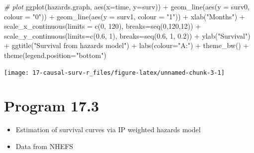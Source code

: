 \documentclass[
  10pt,
]{book}
\newenvironment{Shaded}{\begin{snugshade}}{\end{snugshade}}
\newcommand{\AttributeTok}[1]{\textcolor[rgb]{0.77,0.63,0.00}{#1}}
\newcommand{\CommentTok}[1]{\textcolor[rgb]{0.56,0.35,0.01}{\textit{#1}}}
\newcommand{\DecValTok}[1]{\textcolor[rgb]{0.00,0.00,0.81}{#1}}
\newcommand{\FloatTok}[1]{\textcolor[rgb]{0.00,0.00,0.81}{#1}}
\newcommand{\FunctionTok}[1]{\textcolor[rgb]{0.00,0.00,0.00}{#1}}
\newcommand{\NormalTok}[1]{#1}
\newcommand{\SpecialCharTok}[1]{\textcolor[rgb]{0.00,0.00,0.00}{#1}}
\newcommand{\StringTok}[1]{\textcolor[rgb]{0.31,0.60,0.02}{#1}}
\providecommand{\tightlist}{%
  \setlength{\itemsep}{0pt}\setlength{\parskip}{0pt}}
\begin{document}
\begin{Shaded}
\begin{Highlighting}[]
\CommentTok{\# plot}
\FunctionTok{ggplot}\NormalTok{(hazards.graph, }\FunctionTok{aes}\NormalTok{(}\AttributeTok{x=}\NormalTok{time, }\AttributeTok{y=}\NormalTok{surv)) }\SpecialCharTok{+} 
  \FunctionTok{geom\_line}\NormalTok{(}\FunctionTok{aes}\NormalTok{(}\AttributeTok{y =}\NormalTok{ surv0, }\AttributeTok{colour =} \StringTok{"0"}\NormalTok{)) }\SpecialCharTok{+} 
  \FunctionTok{geom\_line}\NormalTok{(}\FunctionTok{aes}\NormalTok{(}\AttributeTok{y =}\NormalTok{ surv1, }\AttributeTok{colour =} \StringTok{"1"}\NormalTok{)) }\SpecialCharTok{+} 
  \FunctionTok{xlab}\NormalTok{(}\StringTok{"Months"}\NormalTok{) }\SpecialCharTok{+} 
  \FunctionTok{scale\_x\_continuous}\NormalTok{(}\AttributeTok{limits =} \FunctionTok{c}\NormalTok{(}\DecValTok{0}\NormalTok{, }\DecValTok{120}\NormalTok{), }\AttributeTok{breaks=}\FunctionTok{seq}\NormalTok{(}\DecValTok{0}\NormalTok{,}\DecValTok{120}\NormalTok{,}\DecValTok{12}\NormalTok{)) }\SpecialCharTok{+}
  \FunctionTok{scale\_y\_continuous}\NormalTok{(}\AttributeTok{limits=}\FunctionTok{c}\NormalTok{(}\FloatTok{0.6}\NormalTok{, }\DecValTok{1}\NormalTok{), }\AttributeTok{breaks=}\FunctionTok{seq}\NormalTok{(}\FloatTok{0.6}\NormalTok{, }\DecValTok{1}\NormalTok{, }\FloatTok{0.2}\NormalTok{)) }\SpecialCharTok{+}
  \FunctionTok{ylab}\NormalTok{(}\StringTok{"Survival"}\NormalTok{) }\SpecialCharTok{+} 
  \FunctionTok{ggtitle}\NormalTok{(}\StringTok{"Survival from hazards model"}\NormalTok{) }\SpecialCharTok{+} 
  \FunctionTok{labs}\NormalTok{(}\AttributeTok{colour=}\StringTok{"A:"}\NormalTok{) }\SpecialCharTok{+}
  \FunctionTok{theme\_bw}\NormalTok{() }\SpecialCharTok{+} 
  \FunctionTok{theme}\NormalTok{(}\AttributeTok{legend.position=}\StringTok{"bottom"}\NormalTok{)}
\end{Highlighting}
\end{Shaded}

\begin{center}\texttt{[image: 17-causal-surv-r\_files/figure-latex/unnamed-chunk-3-1]} \end{center}

\hypertarget{program-17.3}{%
\section{Program 17.3}\label{program-17.3}}

\begin{itemize}
\tightlist
\item
  Estimation of survival curves via IP weighted hazards model
\item
  Data from NHEFS
\end{itemize}
\end{document}
